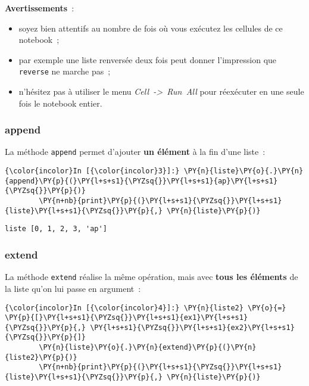     \textbf{Avertissements}~:

\begin{itemize}
\tightlist
\item
  soyez bien attentifs au nombre de fois où vous exécutez les cellules
  de ce notebook~;
\item
  par exemple une liste renversée deux fois peut donner l'impression que
  \texttt{reverse} ne marche pas~;
\item
  n'hésitez pas à utiliser le menu \emph{Cell~-\textgreater{}~Run~All}
  pour réexécuter en une seule fois le notebook entier.
\end{itemize}

    \hypertarget{append}{%
\subsubsection{\texorpdfstring{\textbf{append}}{append}}\label{append}}

    La méthode \texttt{append} permet d'ajouter \textbf{un élément} à la fin
d'une liste~:

    \begin{Verbatim}[commandchars=\\\{\}]
{\color{incolor}In [{\color{incolor}3}]:} \PY{n}{liste}\PY{o}{.}\PY{n}{append}\PY{p}{(}\PY{l+s+s1}{\PYZsq{}}\PY{l+s+s1}{ap}\PY{l+s+s1}{\PYZsq{}}\PY{p}{)}
        \PY{n+nb}{print}\PY{p}{(}\PY{l+s+s1}{\PYZsq{}}\PY{l+s+s1}{liste}\PY{l+s+s1}{\PYZsq{}}\PY{p}{,} \PY{n}{liste}\PY{p}{)}
\end{Verbatim}


    \begin{Verbatim}[commandchars=\\\{\}]
liste [0, 1, 2, 3, 'ap']

    \end{Verbatim}

    \hypertarget{extend}{%
\subsubsection{\texorpdfstring{\textbf{extend}}{extend}}\label{extend}}

    La méthode \texttt{extend} réalise la même opération, mais avec
\textbf{tous les éléments} de la liste qu'on lui passe en argument~:

    \begin{Verbatim}[commandchars=\\\{\}]
{\color{incolor}In [{\color{incolor}4}]:} \PY{n}{liste2} \PY{o}{=} \PY{p}{[}\PY{l+s+s1}{\PYZsq{}}\PY{l+s+s1}{ex1}\PY{l+s+s1}{\PYZsq{}}\PY{p}{,} \PY{l+s+s1}{\PYZsq{}}\PY{l+s+s1}{ex2}\PY{l+s+s1}{\PYZsq{}}\PY{p}{]}
        \PY{n}{liste}\PY{o}{.}\PY{n}{extend}\PY{p}{(}\PY{n}{liste2}\PY{p}{)}
        \PY{n+nb}{print}\PY{p}{(}\PY{l+s+s1}{\PYZsq{}}\PY{l+s+s1}{liste}\PY{l+s+s1}{\PYZsq{}}\PY{p}{,} \PY{n}{liste}\PY{p}{)}
\end{Verbatim}


